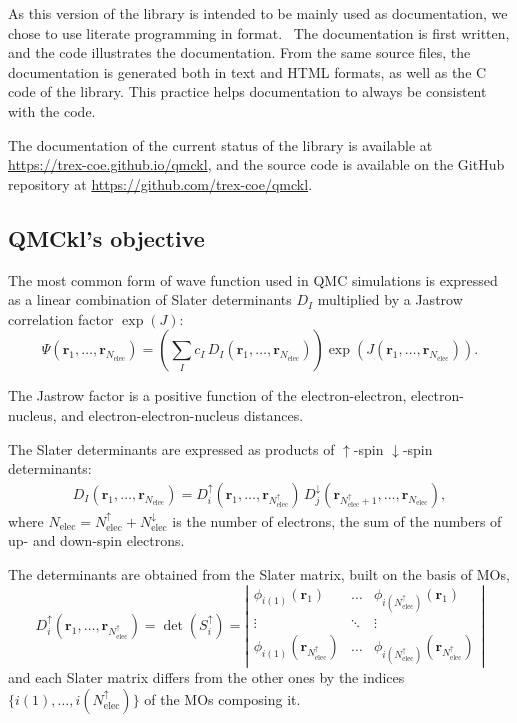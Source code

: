 As this version of the library is intended to be mainly used as documentation,
we chose to use literate programming\cite{knuth_1992} in {\orgmode}
format.~\cite{schulte_2012,orgmode} The documentation
is first written, and the code illustrates the documentation. From the same source files,
the documentation is generated both in text and HTML formats, as well as the C code of the library.
This practice helps documentation to always be consistent with the code.

The documentation of the current status of the library is available
at \url{https://trex-coe.github.io/qmckl}, and the source code is
available on the GitHub repository at \url{https://github.com/trex-coe/qmckl}.

\subsection{QMCkl's objective}

\newcommand{\Nelec}{N_{\text{elec}}}
\newcommand{\Nelecup}{N_{\text{elec}}^\uparrow}
\newcommand{\Nelecdn}{N_{\text{elec}}^\downarrow}
\newcommand{\br}{\mathbf{r}_1,\dots,\mathbf{r}_{\Nelec}}
\newcommand{\brup}{\mathbf{r}_1,\dots,\mathbf{r}_{\Nelec^\uparrow}}
\newcommand{\brdn}{\mathbf{r}_{\Nelec^\uparrow+1},\dots,\mathbf{r}_{\Nelec}}

The most common form of wave function used in \ac{QMC} simulations is
expressed as a linear combination of Slater determinants $D_I$ multiplied by
a Jastrow correlation factor $\exp(J)$:
\begin{equation}
  \Psi(\br) = \left( \sum_I c_I\, D_I(\br) \right) \exp \left( J(\br) \right).
\end{equation}

The Jastrow factor is a positive function of the electron-electron,
electron-nucleus, and electron-electron-nucleus distances.

The Slater determinants are expressed as products of $\uparrow$-spin
$\downarrow$-spin determinants:
\begin{eqnarray}
  D_I(\br) = D_i^\uparrow(\brup)\, D_j^\downarrow(\brdn),
\end{eqnarray}
where $\Nelec = \Nelecup + \Nelecdn$ is the number of
electrons, the sum of the numbers of up- and down-spin electrons.

The determinants are obtained from the Slater matrix, built on the basis of \acp{MO},
\begin{equation}
  D_i^\uparrow(\brup) = \det(S_i^\uparrow) = \left|
  \begin{array}{ccc}
    \phi_{i(1)}(\mathbf{r}_1)          & \dots  & \phi_{i(\Nelecup)}(\mathbf{r}_1)          \\
    \vdots                             & \ddots & \vdots                                    \\
    \phi_{i(1)}(\mathbf{r}_{\Nelecup}) & \dots  & \phi_{i(\Nelecup)}(\mathbf{r}_{\Nelecup})
  \end{array}
  \right|
\end{equation}
and each Slater matrix differs from the other ones by the indices $\{
  i(1), \dots, i(\Nelecup) \}$ of the \acp{MO} composing it.

